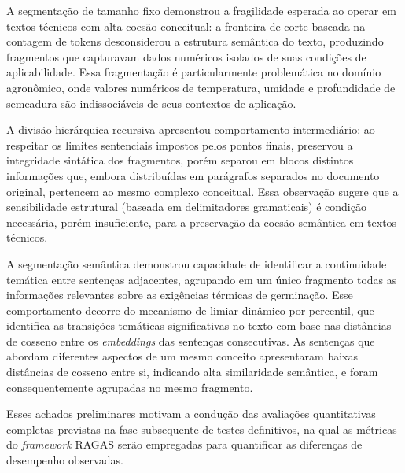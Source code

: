 \documentclass[
	12pt,				%
	openright,			%
	oneside,			%
	a4paper,			%
	tccpreliminar,		%
	]{ABNT-DC-UEL}
\begin{document}
A segmentação de tamanho fixo demonstrou a fragilidade esperada ao operar em textos técnicos com alta coesão conceitual: a fronteira de corte baseada na contagem de tokens desconsiderou a estrutura semântica do texto, produzindo fragmentos que capturavam dados numéricos isolados de suas condições de aplicabilidade. Essa fragmentação é particularmente problemática no domínio agronômico, onde valores numéricos de temperatura, umidade e profundidade de semeadura são indissociáveis de seus contextos de aplicação.

A divisão hierárquica recursiva apresentou comportamento intermediário: ao respeitar os limites sentenciais impostos pelos pontos finais, preservou a integridade sintática dos fragmentos, porém separou em blocos distintos informações que, embora distribuídas em parágrafos separados no documento original, pertencem ao mesmo complexo conceitual. Essa observação sugere que a sensibilidade estrutural (baseada em delimitadores gramaticais) é condição necessária, porém insuficiente, para a preservação da coesão semântica em textos técnicos.

A segmentação semântica demonstrou capacidade de identificar a continuidade temática entre sentenças adjacentes, agrupando em um único fragmento todas as informações relevantes sobre as exigências térmicas de germinação. Esse comportamento decorre do mecanismo de limiar dinâmico por percentil, que identifica as transições temáticas significativas no texto com base nas distâncias de cosseno entre os \textit{embeddings} das sentenças consecutivas. As sentenças que abordam diferentes aspectos de um mesmo conceito apresentaram baixas distâncias de cosseno entre si, indicando alta similaridade semântica, e foram consequentemente agrupadas no mesmo fragmento.

Esses achados preliminares motivam a condução das avaliações quantitativas completas previstas na fase subsequente de testes definitivos, na qual as métricas do \textit{framework} RAGAS serão empregadas para quantificar as diferenças de desempenho observadas.

\postextual





\printindex
\end{document}

